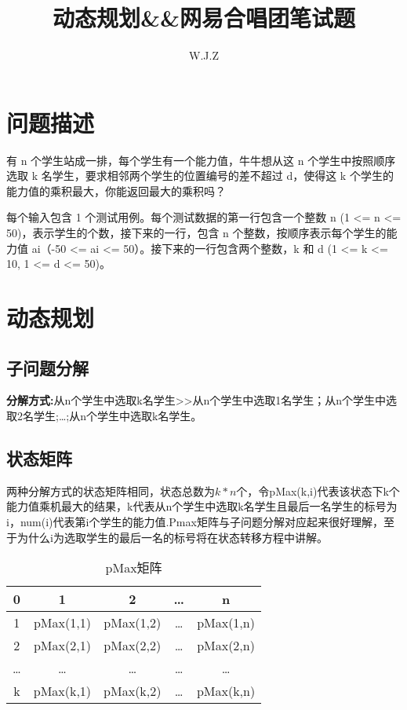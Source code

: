 \documentclass{article}
\title{动态规划\&\&网易合唱团笔试题}
\author{W.J.Z}
\date{}
\begin{document}
	\maketitle
	\section{问题描述}
	
	有 n 个学生站成一排，每个学生有一个能力值，牛牛想从这 n 个学生中按照顺序选取 k 名学生，要求相邻两个学生的位置编号的差不超过 d，使得这 k 个学生的能力值的乘积最大，你能返回最大的乘积吗？ 
	
	
	每个输入包含 1 个测试用例。每个测试数据的第一行包含一个整数 n (1 <= n <= 50)，表示学生的个数，接下来的一行，包含 n 个整数，按顺序表示每个学生的能力值 ai（-50 <= ai <= 50）。接下来的一行包含两个整数，k 和 d (1 <= k <= 10, 1 <= d <= 50)。
	\section{动态规划}
	\subsection{子问题分解}
	\textbf{分解方式:}从n个学生中选取k名学生>>从n个学生中选取1名学生；从n个学生中选取2名学生;\ldots;从n个学生中选取k名学生。

	\subsection{状态矩阵}
	两种分解方式的状态矩阵相同，状态总数为$k*n$个，令pMax(k,i)代表该状态下k个能力值乘机最大的结果，k代表从n个学生中选取k名学生且最后一名学生的标号为i，num(i)代表第i个学生的能力值.Pmax矩阵与子问题分解对应起来很好理解，至于为什么i为选取学生的最后一名的标号将在状态转移方程中讲解。
	\begin{table}[htbp]
		\centering
		\caption{pMax矩阵}
		\begin{tabular}{|c|c|c|c|c|}
			\hline
			0& 1&2 & \ldots & n \\
			\hline
			1&pMax(1,1)&pMax(1,2)&\ldots&pMax(1,n)\\
			\hline
			2&pMax(2,1)&pMax(2,2)&\ldots&pMax(2,n)\\
			\hline
			\ldots&\ldots&\ldots&\ldots&\ldots\\
			\hline
			k&pMax(k,1) & pMax(k,2)&\ldots&pMax(k,n) \\
			\hline
		\end{tabular}
	
	\end{table}
\end{document}
